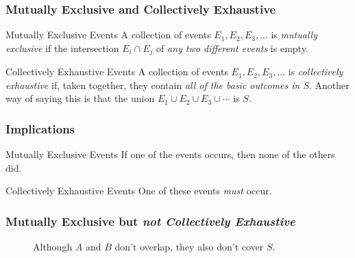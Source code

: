\documentclass[handout]{beamer}
\begin{document}
\begin{frame}
\frametitle{Mutually Exclusive and Collectively Exhaustive}
\begin{block}{Mutually Exclusive Events}
A collection of events $E_1, E_2, E_3, \hdots$ is \emph{\alert{mutually exclusive}} if the intersection $E_i \cap E_j$ of \alert{\emph{any two different events}} is empty.
\end{block}

\begin{block}{Collectively Exhaustive Events}
A collection of events $E_1, E_2, E_3, \hdots$ is \emph{\alert{collectively exhaustive}} if, taken together, they contain \alert{\emph{all of the basic outcomes in $S$}}. Another way of saying this is that the union $E_1 \cup E_2 \cup E_3 \cup \cdots$ is $S$.
\end{block}
\end{frame}
\begin{frame}
\frametitle{Implications}
\begin{block}{Mutually Exclusive Events}
  If one of the events occurs, then none of the others did.
\end{block}

\begin{block}{Collectively Exhaustive Events}
  One of these events \emph{must} occur.
\end{block}
\end{frame}
\def\Srect{(-2,-2) rectangle (4,2)}
\def\Arect{(-2,-2) rectangle (0,2)}
\def\Brect{(0,-2) rectangle (2,2)}
\def\Crect{(0,2) rectangle (4,2)}
\def\Devent{(1.6,-0.3) circle (1.3)}
\def\Eevent{(-1,1.2) circle (0.5)}
\begin{frame}
\frametitle{Mutually Exclusive but \emph{not Collectively Exhaustive}}
\begin{figure}
\centering
{}
\caption{Although $A$ and $B$ don't overlap, they also don't cover $S$.}
\end{figure}
\end{frame}
\end{document}

